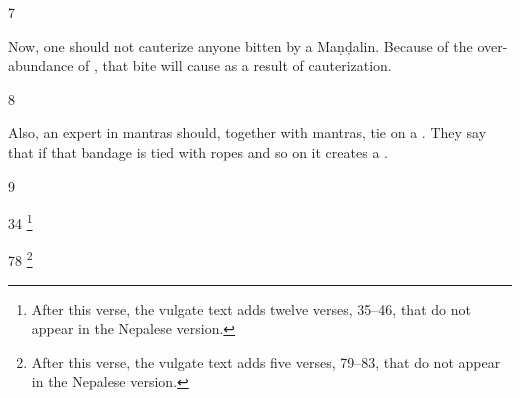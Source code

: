 \begin{translation}
\item[7] 

Now, one should not cauterize anyone bitten by a Maṇḍalin. Because of the
over-abundance of , that bite will cause
 as a result of cauterization.

\item [8]

Also, an expert in mantras should, together with mantras, tie on a
.  They say that if that bandage is tied with ropes
and so on it creates a .

\item[9]





    
    
    \item[34] \footnote{After this verse, the vulgate text adds twelve
    verses, 35--46, that do not appear in the Nepalese version.}
    
     \item[78] \footnote{After this verse, the vulgate text adds five
        verses, 79--83, that do not appear in the Nepalese version.}
\end{translation}    
